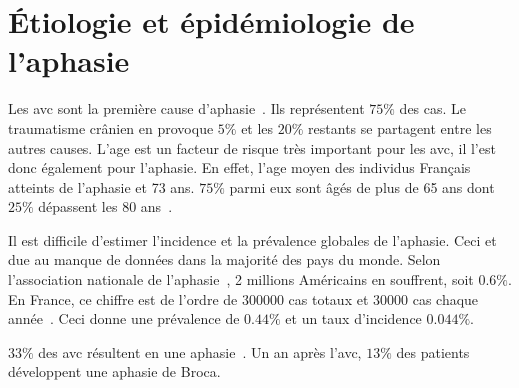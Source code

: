 \section{Étiologie et épidémiologie de l'aphasie}

Les \Acrshort{avc} sont la première cause d'aphasie~\cite{Hallowell_2017}. 
Ils représentent \(75\%\) des cas.
Le traumatisme crânien en provoque \(5\%\) 
et les \(20\%\) restants se partagent entre les autres causes.
L'age est un facteur de risque très important pour les \Acrshort{avc},
il l'est donc également pour l'aphasie. 
En effet, l'age moyen des individus Français atteints de l'aphasie et 73 ans.
\(75\%\) parmi eux sont âgés de plus de 65 ans dont \(25\%\) dépassent les 80 ans~\cite{press}.

Il est difficile d'estimer l'incidence et la prévalence globales de l'aphasie.
Ceci et due au manque de données dans la majorité des pays du monde.
Selon l'association nationale de l'aphasie~\cite{Home}, 2 millions Américains en souffrent, soit \(0.6\%\).
En France, ce chiffre est de l'ordre de 300000 cas totaux et 30000 cas chaque année~\cite{press}.
Ceci donne une prévalence de \(0.44\%\) et un taux d'incidence \(0.044\%\).

\(33\%\) des \Acrshort{avc} résultent en une aphasie~\cite{press}.
Un an après l'\Acrshort{avc}, \(13\%\) des patients développent une aphasie de Broca.
